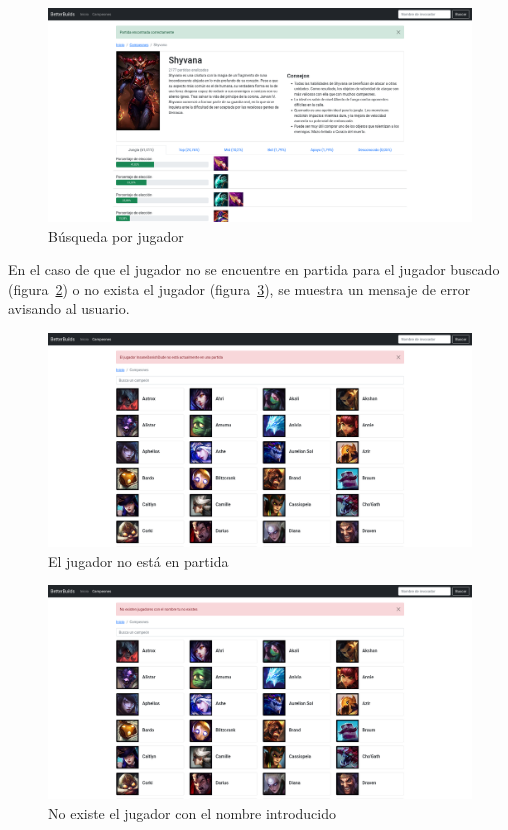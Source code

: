 \begin{figure}[h]
	\centering
	\includegraphics[width=1\linewidth]{img/5.partida}
	\caption{Búsqueda por jugador}
	\label{fig:partida}
\end{figure}

En el caso de que el jugador no se encuentre en partida para el jugador buscado (figura~\ref{fig:no-partida}) o no exista el jugador (figura~\ref{fig:no-existes}), se muestra un mensaje de error avisando al usuario.

\begin{figure}[h]
	\centering
	\includegraphics[width=1\linewidth]{img/6.no-partida}
	\caption{El jugador no está en partida}
	\label{fig:no-partida}
\end{figure}
\begin{figure}
	\centering
	\includegraphics[width=1\linewidth]{img/7.no-existes}
	\caption{No existe el jugador con el nombre introducido}
	\label{fig:no-existes}
\end{figure}
